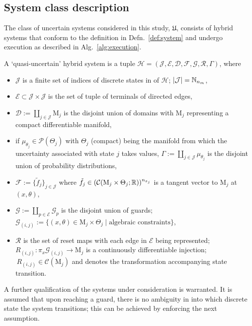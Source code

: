  \subsection{System class description}
  The class of uncertain systems considered in this study, $\mathfrak{U}$, consists of hybrid systems that conform to the definition in Defn.~\ref{def:system} and undergo execution as described in Alg.~\ref{alg:execution}.
\begin{defn}\label{def:system}
  A `quasi-uncertain' hybrid system is a tuple \mbox{$\mathcal H=(\mathcal J,\mathcal E,\mathcal D,\mathcal F,\mathcal G,\mathcal R,\Gamma)$}, where
  \begin{itemize}
    \item $\mathcal J$ is a finite set of indices of discrete states in of $\mathcal H$; $|\mathcal J|=\mathbb{N}_{n_m}$,
    \item $\mathcal E\subset \mathcal J\times \mathcal J$ is the set of tuple of terminals of directed edges,
    \item $\mathcal D:=\coprod_{j\in\mathcal J} \mathrm{M}_j$ is the disjoint union of domains with  $\mathrm{M}_j$ representing a compact differentiable manifold,
    \item if $\mu_{\theta_j}\in \mathcal P(\Theta_j)$ with  $\Theta_j$ (compact) being the manifold from which the uncertainty associated with state $j$ takes values, $\Gamma:=\coprod_{j\in \mathcal J} \mu_{\theta_j}$ is the disjoint union of probability distributions,
    \item $\mathcal F:=\{\tilde f_j\}_{j\in \mathcal J}$ where \mbox{$\tilde f_j\in (\mathcal C(\mathrm{M}_j\times \Theta_j;\mathbb{R}))^{n_{x_j}}$} is a tangent vector to $\mathrm{M}_j$ at $(x,\theta)$,
    \item $\mathcal G:=\coprod_{p\in \mathcal E}\mathcal G_p$ is the disjoint union of guards; \mbox{$\mathcal G_{(i,j)}:=\{(x,\theta)\in \mathrm{M}_j\times \Theta_j\mid \text{algebraic constraints}\}$},
    \item $\mathcal R$ is the set of reset maps with each edge in $\mathcal E$ being represented; $R_{(i,j)}\colon \pi_{x}\mathcal G_{(i,j)}\rightarrow \mathrm{M}_j$ is a continuously differentiable injection; $\,R_{(i,j)}\in \mathcal C(\mathrm{M}_j)$ and denotes the transformation accompanying state transition.
  \end{itemize}
\end{defn}
A further qualification of the systems under consideration is warranted. It is assumed that upon reaching a guard, there is no ambiguity in into which discrete state the system transitions; this can be achieved by enforcing the next assumption.
